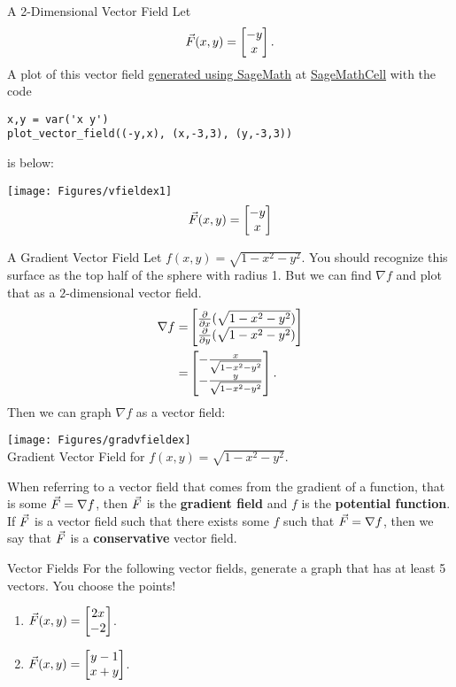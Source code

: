 \begin{example}{A 2-Dimensional Vector Field}
Let $$\vec{F}(x,y)=\begin{bmatrix}-y\\x\end{bmatrix}.$$ A plot of this vector field \href{https://doc.sagemath.org/html/en/reference/plotting/sage/plot/plot_field.html#}{generated using SageMath} at \href{https://sagecell.sagemath.org/}{SageMathCell} with the code
\vspace{1em}
\begin{verbatim}
x,y = var('x y')
plot_vector_field((-y,x), (x,-3,3), (y,-3,3))
\end{verbatim}
\vspace{1em}
\hypertarget{curl2}{is below:}
\vspace{1em}
\begin{center}
\texttt{[image: Figures/vfieldex1]}
$$\vec{F}(x,y)=\begin{bmatrix}-y\\x\end{bmatrix} $$
\end{center}
\end{example}

\begin{example}{A Gradient Vector Field}
Let $f(x,y)=\sqrt{1-x^2-y^2}$. You should recognize this surface as the top half of the sphere with radius 1. But we can find $\nabla f$ and plot that as a $2$-dimensional vector field.
\begin{align*}
\nabla f=&\begin{bmatrix}\frac{\partial }{\partial x}(\sqrt{1-x^2-y^2})\\ \frac{\partial }{\partial y}(\sqrt{1-x^2-y^2})\end{bmatrix}\\
=&\begin{bmatrix}-\frac{x}{\sqrt{1-x^2-y^2}}\\-\frac{y}{\sqrt{1-x^2-y^2}}\end{bmatrix}.
\end{align*}
Then we can graph $\nabla f$ as a vector field:
\vspace{1em}
\begin{center}
\texttt{[image: Figures/gradvfieldex]}\\
Gradient Vector Field for $f(x,y)=\sqrt{1-x^2-y^2}$.
\end{center}
\vspace{1em}
When referring to a vector field that comes from the gradient of a function, that is some $\vec{F}=\nabla f$, then $\vec{F}$ is the \textbf{gradient field} and $f$ is the \textbf{potential function}. If $\vec{F}$ is a vector field such that there exists some $f$ such that $\vec{F}=\nabla f$, then we say that $\vec{F}$ is a \textbf{conservative} vector field.
\end{example}

\begin{exercise}{Vector Fields}
For the following vector fields, generate a graph that has at least 5 vectors. You choose the points!
\vspace{1em}
\begin{enumerate}
\item $\vec{F}(x,y)=\begin{bmatrix}2x\\-2\end{bmatrix}$.
\vspace{1em}
\item $\vec{F}(x,y)=\begin{bmatrix}y-1\\x+y\end{bmatrix}$.
\end{enumerate}
\end{exercise}

